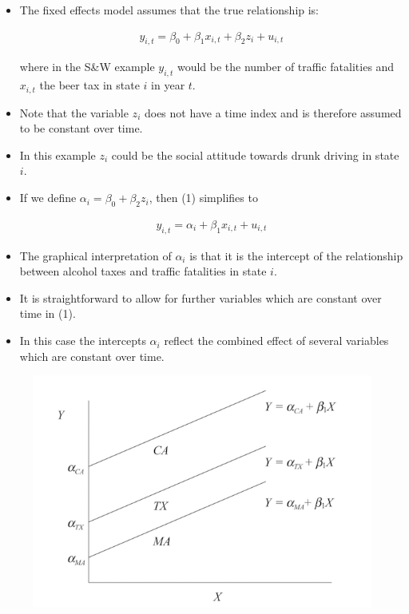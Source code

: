 \documentclass[]{article}
\theoremstyle{definition}
\theoremstyle{definition}
\theoremstyle{remark}
\begin{document}
\begin{itemize}
\item
  The fixed effects model assumes that the true relationship is:

  \[\begin{aligned}
  y_{i,t} = \beta_0 + \beta_1x_{i,t} + \beta_2z_i + u_{i,t} \end{aligned}\]

  where in the S\&W example \(y_{i,t}\) would be the number of traffic
  fatalities and \(x_{i,t}\) the beer tax in state \(i\) in year \(t\).
\item
  Note that the variable \(z_i\) does not have a time index and is
  therefore assumed to be constant over time.
\item
  In this example \(z_i\) could be the social attitude towards drunk
  driving in state \(i\).
\item
  If we define \(\alpha_i = \beta_0 + \beta_2z_i\), then (1) simplifies
  to

  \[\begin{aligned}
  y_{i,t} = \alpha_i + \beta_1x_{i,t} + u_{i,t} \end{aligned}\]
\item
  The graphical interpretation of \(\alpha_i\) is that it is the
  intercept of the relationship between alcohol taxes and traffic
  fatalities in state \(i\).
\item
  It is straightforward to allow for further variables which are
  constant over time in (1).
\item
  In this case the intercepts \(\alpha_i\) reflect the combined effect
  of several variables which are constant over time.
\end{itemize}

\begin{figure}[htbp]
\centering
\includegraphics{./img/fixed_effects.png}
\caption{}
\end{figure}
\end{document}
